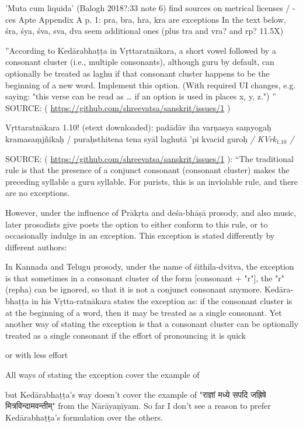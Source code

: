 \documentclass[11pt]{article}
\begin{document}
'Muta cum liquida' (Balogh 2018?:33 note 6) find sources on metrical licenses / -ces
Apte Appendix A p. 1: pra, bra, hra, kra are exceptions
In the text below, śra, śya, śva, sva, dva seem additional ones (plus tra and vra? and rp? 11.5X)

''According to Kedārabhaṭṭa in Vṛttaratnākara, a short vowel followed by a consonant cluster 
(i.e., multiple consonants), although guru by default, can optionally be treated as laghu if
that consonant cluster happens to be the beginning of a new word. Implement this option.
(With required UI changes, e.g. saying: "this verse can be read as \ldots{} if an option is used in places x, y, z.") ''
SOURCE: ( \url{https://github.com/shreevatsa/sanskrit/issues/1} )

Vṛttaratnākara 1.10! (etext downloaded):
padādāv iha varṇasya saṃyogaḥ kramasaṃjñikaḥ /
puraḥsthitena tena syāl laghutā 'pi kvacid guroḥ \emph{/ KVrk\(_{\text{1.10}}\) /}

SOURCE: ( \url{https://github.com/shreevatsa/sanskrit/issues/1} ):
``The traditional rule is that the presence of a conjunct consonant (consonant cluster) makes
  the preceding syllable a guru syllable. For purists, this is an inviolable rule, and there are no exceptions.

However, under the influence of Prākṛta and deśa-bhāṣā prosody, and also music, 
later prosodists give poets the option to either conform to this rule, or to occasionally indulge in an exception.
This exception is stated differently by different authors:

In Kannada and Telugu prosody, under the name of śithila-dvitva, the exception is that sometimes in
a consonant cluster of the form [consonant + "r"], the "r" (repha) can be ignored, so that it is not a conjunct consonant anymore.
Kedāra-bhaṭṭa in his Vṛtta-ratnākara states the exception as: if the consonant cluster is at the
beginning of a word, then it may be treated as a single consonant.
Yet another way of stating the exception is that a consonant cluster can be optionally 
treated as a single consonant if the effort of pronouncing it is quick 

or with less effort

All ways of stating the exception cover the example of

but Kedārabhaṭṭa's way doesn't cover the example of "राज्ञां मध्ये सपदि जह्रिषे मित्रविन्दामवन्तीम्" from the Nārāyaṇīyam. So far I don't see a reason to prefer Kedārabhaṭṭa's formulation over the others.
\end{document}
